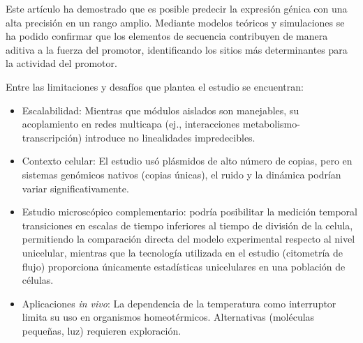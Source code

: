 \documentclass[nochap]{config/ejercicios}
\begin{document}

Este artículo ha demostrado que es posible predecir la expresión génica con una alta precisión en un rango amplio. Mediante modelos teóricos y simulaciones se ha podido confirmar que los elementos de secuencia contribuyen de manera aditiva a la fuerza del promotor, identificando los sitios más determinantes para la actividad del promotor.



Entre las limitaciones y desafíos que plantea el estudio se encuentran:
\begin{itemize}
    \item Escalabilidad: Mientras que módulos aislados son manejables, su acoplamiento en redes multicapa (ej., interacciones metabolismo-transcripción) introduce no linealidades impredecibles.
    \item Contexto celular: El estudio usó plásmidos de alto número de copias, pero en sistemas genómicos nativos (copias únicas), el ruido y la dinámica podrían variar significativamente.
    \item Estudio microscópico complementario: podría posibilitar la medición temporal transiciones en escalas de tiempo inferiores al tiempo de división de la celula, permitiendo la comparación directa del modelo experimental respecto al nivel unicelular, mientras que la tecnología utilizada en el estudio (citometría de flujo) proporciona únicamente estadísticas unicelulares en una población de células.
    \item Aplicaciones \textit{in vivo}: La dependencia de la temperatura como interruptor limita su uso en organismos homeotérmicos. Alternativas (moléculas pequeñas, luz) requieren exploración.
\end{itemize}
\end{document}
